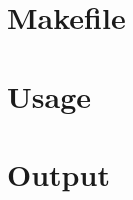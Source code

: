 \documentclass[12pt, a4paper]{article}
\begin{document}
\section{Makefile}

\begin{scriptsize}
\begin{ttfamily}

\end{ttfamily}
\end{scriptsize}

\section{Usage}

\begin{scriptsize}
\begin{ttfamily}

\end{ttfamily}
\end{scriptsize}

\section{Output}
\end{document}
